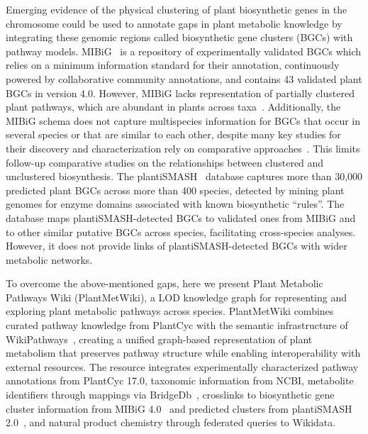 \documentclass[11pt,a4paper]{article}
\begin{document}
Emerging evidence of the physical clustering of plant biosynthetic genes in the chromosome could be
used to annotate gaps in plant metabolic knowledge by integrating these genomic regions called
biosynthetic gene clusters (BGCs) with pathway models. MIBiG~\cite{zdouc2025} is a repository of
experimentally validated BGCs which relies on a minimum information standard for their annotation,
continuously powered by collaborative community annotations, and contains 43 validated plant BGCs in
version 4.0. However, MIBiG lacks representation of partially clustered plant pathways, which are
abundant in plants across taxa~\cite{itkin2013}. Additionally, the MIBiG schema does not capture
multispecies information for BGCs that occur in several species or that are similar to each other,
despite many key studies for their discovery and characterization rely on comparative
approaches~\cite{franke2019,li2021}. This limits follow-up comparative studies on the relationships
between clustered and unclustered biosynthesis. The plantiSMASH~\cite{delpup2026} database captures
more than 30,000 predicted plant BGCs across more than 400 species, detected by mining plant genomes
for enzyme domains associated with known biosynthetic ``rules''. The database maps
plantiSMASH-detected BGCs to validated ones from MIBiG and to other similar putative BGCs across
species, facilitating cross-species analyses. However, it does not provide links of
plantiSMASH-detected BGCs with wider metabolic networks.

To overcome the above-mentioned gaps, here we present Plant Metabolic Pathways Wiki (PlantMetWiki), a
LOD knowledge graph for representing and exploring plant metabolic pathways across species.
PlantMetWiki combines curated pathway knowledge from PlantCyc with the semantic infrastructure of
WikiPathways~\cite{agrawal2024}, creating a unified graph-based representation of plant metabolism
that preserves pathway structure while enabling interoperability with external resources. The
resource integrates experimentally characterized pathway annotations from PlantCyc 17.0, taxonomic
information from NCBI, metabolite identifiers through mappings via
BridgeDb~\cite{slenter2018,vaniersel2010}, crosslinks to biosynthetic gene cluster information from
MIBiG 4.0~\cite{zdouc2025} and predicted clusters from plantiSMASH 2.0~\cite{delpup2026}, and natural
product chemistry through federated queries to Wikidata.
\end{document}

